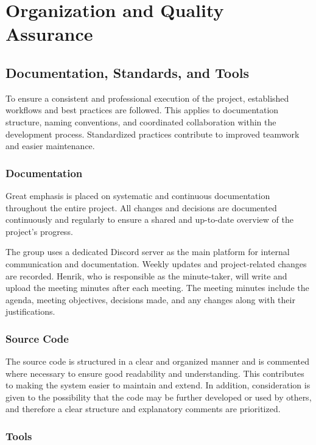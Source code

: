 \section{Organization and Quality Assurance}

\subsection{Documentation, Standards, and Tools}

To ensure a consistent and professional execution of the project, established workflows and best practices are followed. This applies to documentation structure, naming conventions, and coordinated collaboration within the development process. Standardized practices contribute to improved teamwork and easier maintenance.

\subsubsection{Documentation}

Great emphasis is placed on systematic and continuous documentation throughout the entire project. All changes and decisions are documented continuously and regularly to ensure a shared and up-to-date overview of the project's progress.

The group uses a dedicated Discord server as the main platform for internal communication and documentation. Weekly updates and project-related changes are recorded. Henrik, who is responsible as the minute-taker, will write and upload the meeting minutes after each meeting. The meeting minutes include the agenda, meeting objectives, decisions made, and any changes along with their justifications.

\subsubsection{Source Code}

The source code is structured in a clear and organized manner and is commented where necessary to ensure good readability and understanding. This contributes to making the system easier to maintain and extend. In addition, consideration is given to the possibility that the code may be further developed or used by others, and therefore a clear structure and explanatory comments are prioritized.

\subsubsection{Tools}


